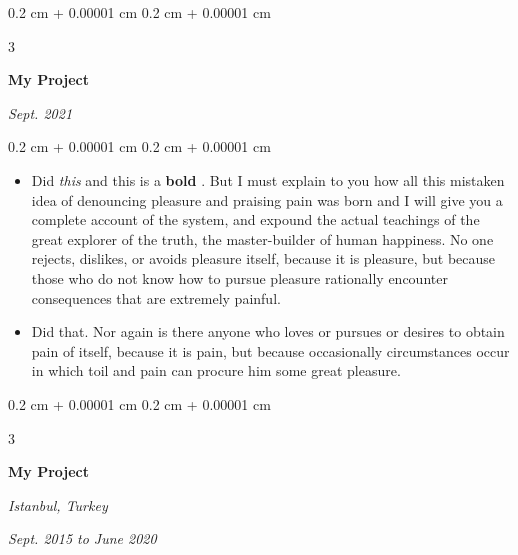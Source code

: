 \documentclass[10pt, letterpaper]{article}
\newenvironment{highlights}{
    \begin{itemize}[
        topsep=0.10 cm,
        parsep=0.10 cm,
        partopsep=0pt,
        itemsep=0pt,
        leftmargin=0.4 cm + 10pt + 0.6 cm
    ]
}{
    \end{itemize}
} %
\newenvironment{onecolentry}{
    \begin{adjustwidth}{
        0.2 cm + 0.00001 cm
    }{
        0.2 cm + 0.00001 cm
    }
}{
    \end{adjustwidth}
} %
\newenvironment{threecolentry}[3][]{
    \onecolentry
    \def\thirdColumn{#3}
    \setcolumnwidth{0.6 cm, \fill, 4.5 cm}
    \begin{paracol}{3}
    #2 \switchcolumn
}{
    \switchcolumn \raggedleft \thirdColumn
    \end{paracol}
    \endonecolentry
} %
\let\hrefWithoutArrow\href
\renewcommand{\href}[2]{\hrefWithoutArrow{#1}{\mbox{\ifthenelse{\equal{#2}{}}{ }{#2 }\raisebox{.15ex}{\footnotesize \faExternalLink*}}}}
\begin{document}
        \vspace{0.2 cm-3px}

        \begin{threecolentry}{
            \vspace*{\fill}
            \textbullet
            \vspace*{3px}
            \vspace*{\fill}
        }{
            
            
        \textit{Sept. 2021}}
            \textbf{My Project}
        \end{threecolentry}

        \vspace{0.10 cm-3px}
        \begin{onecolentry}
            \begin{highlights}
                \item Did \textit{this} and this is a \textbf{bold} \href{https://example.com}{link}. But I must explain to you how all this mistaken idea of denouncing pleasure and praising pain was born and I will give you a complete account of the system, and expound the actual teachings of the great explorer of the truth, the master-builder of human happiness. No one rejects, dislikes, or avoids pleasure itself, because it is pleasure, but because those who do not know how to pursue pleasure rationally encounter consequences that are extremely painful.
                \item Did that. Nor again is there anyone who loves or pursues or desires to obtain pain of itself, because it is pain, but because occasionally circumstances occur in which toil and pain can procure him some great pleasure.
            \end{highlights}
        \end{onecolentry}


        \vspace{0.2 cm-3px}

        \begin{threecolentry}{
            \vspace*{\fill}
            \textbullet
            \vspace*{3px}
            \vspace*{\fill}
        }{
        \textit{Istanbul, Turkey}    
            
        \textit{Sept. 2015 to June 2020}}
            \textbf{My Project}
        \end{threecolentry}
\end{document}
